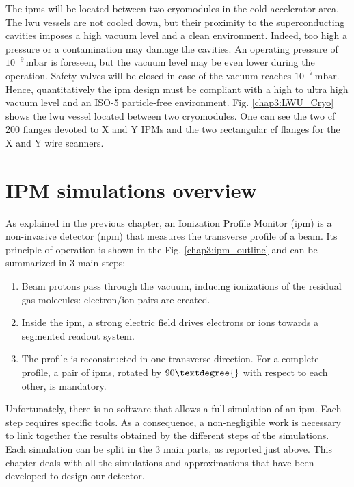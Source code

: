 \begin{refsection}
  The \acrshort{ipm}s will be located between two cryomodules in the cold accelerator area. The \acrshort{lwu} vessels are not cooled down, but their proximity to the superconducting cavities imposes a high vacuum level and a clean environment. Indeed, too high a pressure or a contamination may damage the cavities. An operating pressure of \(10^{-9}\,\mathrm{mbar}\) is foreseen, but the vacuum level may be even lower during the operation. Safety valves will be closed in case of the vacuum reaches \(10^{-7}\,\mathrm{mbar}\). Hence, quantitatively the \acrshort{ipm} design must be compliant with a high to ultra high vacuum level and an ISO-5 \cite{ISO14644} particle-free environment. Fig. \ref{chap3:LWU_Cryo} shows the \acrshort{lwu} vessel located between two cryomodules. One can see the two \acrshort{cf} 200 flanges devoted to X and Y IPMs and the two rectangular \acrshort{cf} flanges for the X and Y wire scanners.

  \section{IPM simulations overview}

  

  As explained in the previous chapter, an Ionization Profile Monitor (\acrshort{ipm}) is a non-invasive detector (\acrshort{npm}) that measures the transverse profile of a beam.
  Its principle of operation is shown in the Fig. \ref{chap3:ipm_outline} and can be summarized in 3 main steps:
  \begin{enumerate}
    \item Beam protons pass through the vacuum, inducing ionizations of the residual gas molecules: electron/ion pairs are created.
    \item Inside the \acrshort{ipm}, a strong electric field drives electrons or ions towards a segmented readout system.
    \item The profile is reconstructed in one transverse direction. For a complete profile, a pair of \acrshort{ipm}s, rotated by $90\textdegree{}$ with respect to each other, is mandatory.
  \end{enumerate}

  Unfortunately, there is no software that allows a full simulation of an \acrshort{ipm}. Each step requires specific tools. As a consequence, a non-negligible work is necessary to link together the results obtained by the different steps of the simulations. Each simulation can be split in the 3 main parts, as reported just above. This chapter deals with all the simulations and approximations that have been developed to design our detector.


\end{refsection}
